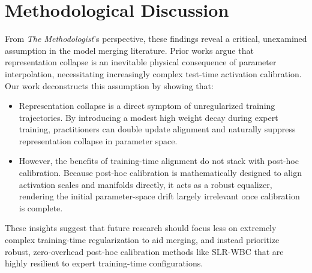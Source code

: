 \documentclass{article}
\theoremstyle{plain}
\theoremstyle{definition}
\theoremstyle{remark}
\begin{document}
\begin{table}[h]
\vspace{-5pt}
\caption{TIES and DARE Average Test Accuracies (\%)}
\label{tab:ties_dare_comparison}
\vskip 0.1in
\begin{center}
\begin{small}
\end{small}
\end{center}
\vskip -0.1in
\vspace{-10pt}
\end{table}

\section{Methodological Discussion}
From \textit{The Methodologist}'s perspective, these findings reveal a critical, unexamined assumption in the model merging literature. Prior works argue that representation collapse is an inevitable physical consequence of parameter interpolation, necessitating increasingly complex test-time activation calibration. Our work deconstructs this assumption by showing that:
\begin{itemize}\itemsep=0pt \parsep=0pt
    \item Representation collapse is a direct symptom of unregularized training trajectories. By introducing a modest high weight decay during expert training, practitioners can double update alignment and naturally suppress representation collapse in parameter space.
    \item However, the benefits of training-time alignment do not stack with post-hoc calibration. Because post-hoc calibration is mathematically designed to align activation scales and manifolds directly, it acts as a robust equalizer, rendering the initial parameter-space drift largely irrelevant once calibration is complete.
\end{itemize}
These insights suggest that future research should focus less on extremely complex training-time regularization to aid merging, and instead prioritize robust, zero-overhead post-hoc calibration methods like SLR-WBC that are highly resilient to expert training-time configurations.
\end{document}
